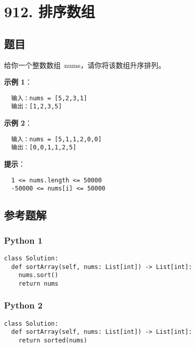 \newpage
\section{912. 排序数组}
\label{leetcode:912}

\subsection{题目}

给你一个整数数组 nums，请你将该数组升序排列。

\textbf{示例 1}：

\begin{verbatim}
  输入：nums = [5,2,3,1]
  输出：[1,2,3,5]
\end{verbatim}

\textbf{示例 2}：

\begin{verbatim}
  输入：nums = [5,1,1,2,0,0]
  输出：[0,0,1,1,2,5]
\end{verbatim}

\textbf{提示}：

\begin{verbatim}
  1 <= nums.length <= 50000
  -50000 <= nums[i] <= 50000
\end{verbatim}

\subsection{参考题解}

\subsubsection{Python 1}

\begin{verbatim}
class Solution:
  def sortArray(self, nums: List[int]) -> List[int]:
    nums.sort()
    return nums
\end{verbatim}

\subsubsection{Python 2}

\begin{verbatim}
class Solution:
  def sortArray(self, nums: List[int]) -> List[int]:
    return sorted(nums)
\end{verbatim}

